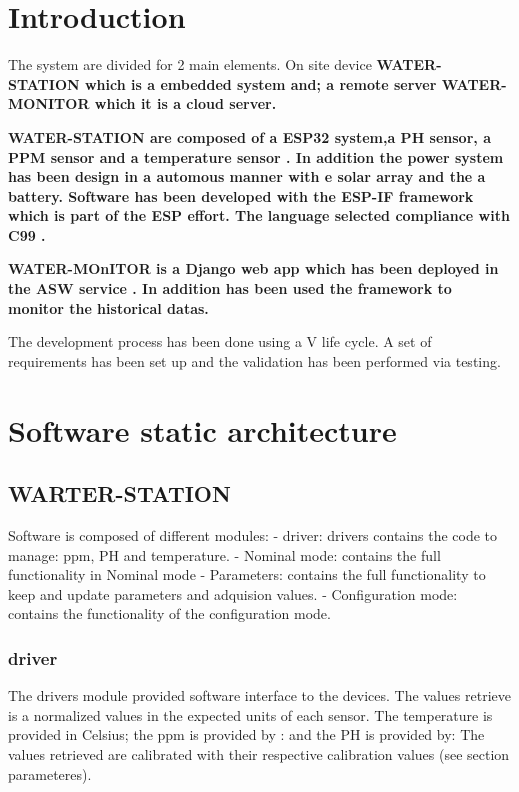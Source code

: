 \section{Introduction}

The system are divided for 2 main elements. On site device \bf{WATER-STATION} which is a embedded system and; a remote server \bf{WATER-MONITOR} which it is a cloud server.

\bf{WATER-STATION}  are composed of a  ESP32 system\cite{},a  PH sensor\cite{}, a PPM sensor\cite{} and a temperature sensor \cite{}. In addition the power system has been design in a automous manner with e solar array and the a battery. Software has been developed with the ESP-IF framework which is part of the ESP effort. The language selected compliance with C99 \cite{}.

\bf{WATER-MOnITOR} is a Django \cite{} web app which has been deployed in the ASW service \cite{}. In addition has been used the framework \cite{} to monitor the historical datas.

The development process has been done using a V life cycle. A set of requirements has been set up \cite{} and the validation has been performed via testing.

\section{Software static architecture}
\subsection{WARTER-STATION}
Software is composed of different modules:
- driver: drivers contains the code to manage: ppm, PH and temperature.
- Nominal mode: contains the full functionality in Nominal mode
- Parameters: contains the full functionality to keep and update parameters and adquision values.
- Configuration mode: contains the functionality of the configuration mode.

\subsubsection{driver}
The drivers module provided software interface to the devices. The values retrieve is a normalized values in the expected units of each sensor. The temperature is provided in Celsius; the ppm is provided by :  and the PH is provided by: The values retrieved are calibrated with their respective calibration values (see section parameteres).

